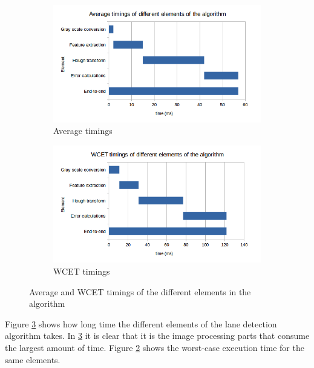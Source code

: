 \begin{figure}[H]
  \begin{subfigure}[b]{\textwidth}
    \includegraphics[width=1\linewidth]{./img/AVERAGE_timings_2.png}
    \caption{\label{fig:Average timings}Average timings}
  \end{subfigure}
  \begin{subfigure}[b]{\textwidth}
    \includegraphics[width=1\linewidth]{./img/WCET_timings.png}
    \caption{\label{fig:WCET timings}WCET timings}
  \end{subfigure}
  \caption{\label{fig:Average and WCET timings of the different elements in the algorithm}Average and WCET timings of the different elements in the algorithm}
\end{figure}

Figure \ref{fig:Average and WCET timings of the different elements in the algorithm} shows how long time the different elements of the lane detection algorithm takes. In \ref{fig:Average and WCET timings of the different elements in the algorithm} it is clear that it is the image processing parts that consume the largest amount of time. Figure \ref{fig:WCET timings} shows the worst-case execution time for the same elements.\\




